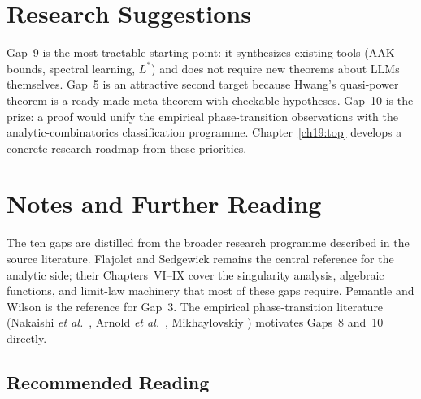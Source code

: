 \section{Research Suggestions}

Gap~9 is the most tractable starting point: it synthesizes existing tools (AAK bounds, spectral learning, $L^*$) and does not require new theorems about LLMs themselves. Gap~5 is an attractive second target because Hwang's quasi-power theorem is a ready-made meta-theorem with checkable hypotheses. Gap~10 is the prize: a proof would unify the empirical phase-transition observations with the analytic-combinatorics classification programme. Chapter~\ref{ch19:top} develops a concrete research roadmap from these priorities.

\section{Notes and Further Reading}

The ten gaps are distilled from the broader research programme described in the source literature. Flajolet and Sedgewick \cite{FlajoletSedgewick2009} remains the central reference for the analytic side; their Chapters~VI--IX cover the singularity analysis, algebraic functions, and limit-law machinery that most of these gaps require. Pemantle and Wilson \cite{PemantleWilson2013} is the reference for Gap~3. The empirical phase-transition literature (Nakaishi \emph{et al.}\ \cite{NakaishiNishikawaHukushima2024}, Arnold \emph{et al.}\ \cite{ArnoldEtAl2024}, Mikhaylovskiy \cite{Mikhaylovskiy2025}) motivates Gaps~8 and~10 directly.

\subsection*{Recommended Reading}

